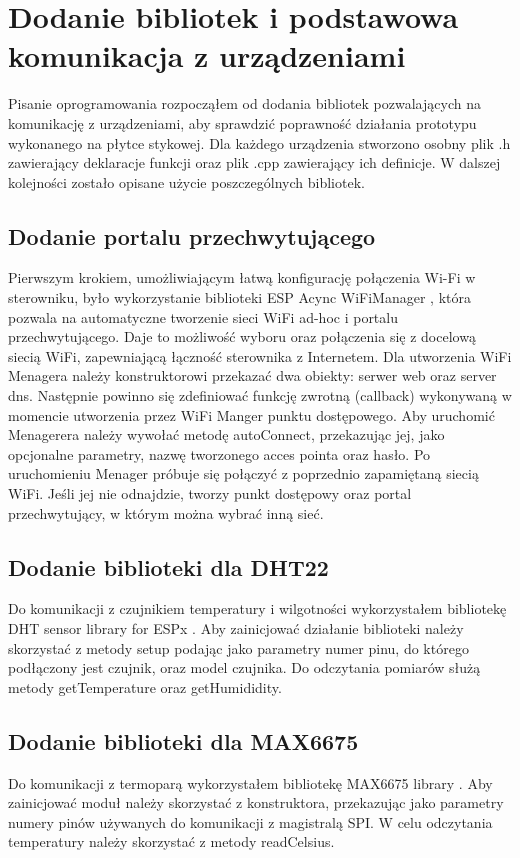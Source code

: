\documentclass[11pt]{report}
\begin{document}
 \section{Dodanie bibliotek i podstawowa komunikacja z urządzeniami}
 Pisanie oprogramowania rozpocząłem od dodania bibliotek pozwalających na komunikację z urządzeniami, aby sprawdzić poprawność działania prototypu wykonanego na płytce stykowej. Dla każdego urządzenia stworzono osobny plik .h zawierający deklaracje funkcji oraz plik .cpp zawierający ich definicje.
 W dalszej kolejności zostało opisane użycie poszczególnych bibliotek.
  \subsection{Dodanie portalu przechwytującego}
 Pierwszym krokiem, umożliwiającym łatwą konfigurację połączenia Wi-Fi w sterowniku, było wykorzystanie biblioteki ESP Acync WiFiManager \cite{WiFiManager}, która pozwala na automatyczne tworzenie sieci WiFi ad-hoc i portalu przechwytującego. Daje to możliwość wyboru oraz połączenia się z docelową siecią WiFi, zapewniającą łączność sterownika z Internetem.
 Dla utworzenia WiFi Menagera należy konstruktorowi przekazać dwa obiekty: serwer web oraz server dns. Następnie powinno się zdefiniować funkcję zwrotną (callback) wykonywaną w momencie utworzenia przez WiFi Manger punktu dostępowego. Aby uruchomić Menagerera należy wywołać metodę autoConnect, przekazując jej, jako opcjonalne parametry, nazwę tworzonego acces pointa oraz hasło. Po uruchomieniu Menager próbuje się połączyć z poprzednio zapamiętaną siecią WiFi. Jeśli jej nie odnajdzie, tworzy punkt dostępowy oraz portal przechwytujący, w którym można wybrać inną sieć.
 \subsection{Dodanie biblioteki dla DHT22}
 Do komunikacji z czujnikiem temperatury i wilgotności wykorzystałem bibliotekę DHT sensor library for ESPx \cite{DHTlibrary}. Aby zainicjować działanie biblioteki należy skorzystać z metody setup podając jako parametry numer pinu, do którego podłączony jest czujnik, oraz model czujnika. Do odczytania pomiarów służą metody getTemperature oraz getHumididity.
 \subsection{Dodanie biblioteki dla MAX6675}
 Do komunikacji z termoparą wykorzystałem bibliotekę MAX6675 library \cite{MAX6675library}. Aby zainicjować moduł należy skorzystać z konstruktora, przekazując jako parametry numery pinów używanych do komunikacji z magistralą SPI.
 W celu odczytania temperatury należy skorzystać z metody readCelsius.
\end{document}
